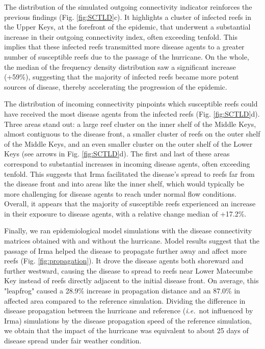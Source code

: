 \documentclass[fleqn,10pt]{wlscirep}
\newcommand{\ie}{{\it i.e.}\ }
\begin{document}
The distribution of the simulated outgoing connectivity indicator reinforces the previous findings (Fig. \ref{fig:SCTLD}c). It highlights a cluster of infected reefs in the Upper Keys, at the forefront of the epidemic, that underwent a substantial increase in their outgoing connectivity index, often exceeding tenfold. This implies that these infected reefs transmitted more disease agents to a greater number of susceptible reefs due to the passage of the hurricane. On the whole, the median of the frequency density distribution saw a significant increase (+59\%), suggesting that the majority of infected reefs became more potent sources of disease, thereby accelerating the progression of the epidemic.

The distribution of incoming connectivity pinpoints which susceptible reefs could have received the most disease agents from the infected reefs (Fig. \ref{fig:SCTLD}d). Three areas stand out: a large reef cluster on the inner shelf of the Middle Keys, almost contiguous to the disease front, a smaller cluster of reefs on the outer shelf of the Middle Keys, and an even smaller cluster on the outer shelf of the Lower Keys (see arrows in Fig. \ref{fig:SCTLD}d). The first and last of these areas correspond to substantial increases in incoming disease agents, often exceeding tenfold. This suggests that Irma facilitated the disease's spread to reefs far from the disease front and into areas like the inner shelf, which would typically be more challenging for disease agents to reach under normal flow conditions. Overall, it appears that the majority of susceptible reefs experienced an increase in their exposure to disease agents, with a relative change median of +17.2\%.

Finally, we ran epidemiological model simulations with the disease connectivity matrices obtained with and without the hurricane. Model results suggest that the passage of Irma helped the disease to
propagate further away and affect more reefs (Fig. \ref{fig:propagation}). It drove the disease agents both shoreward and further westward, causing the disease to spread to reefs near Lower Matecumbe Key instead of reefs directly adjacent to the initial disease front. On average, this "leapfrog" caused a 28.9\% increase in propagation distance and an 87.0\% in affected area compared to the reference simulation. Dividing the difference in disease propagation between the hurricane and reference (\ie not influenced by Irma) simulations by the disease propagation speed of the reference simulation, we obtain that the impact of the hurricane was equivalent to about 25 days of disease spread under fair weather condition.
\end{document}
